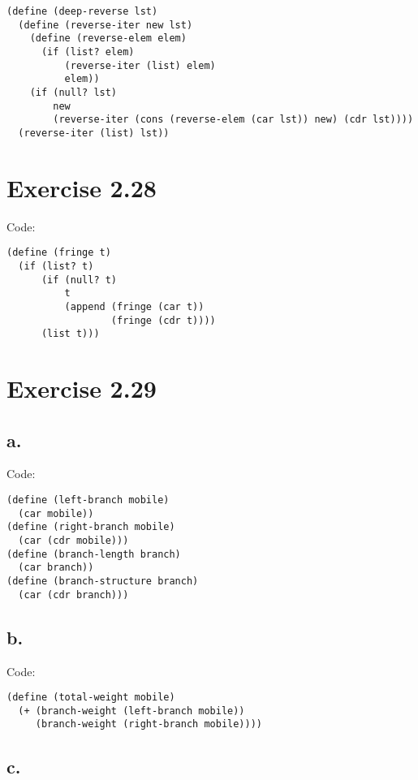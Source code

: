\documentclass[../main.tex]{subfiles}
\begin{document}
\begin{lstlisting}
(define (deep-reverse lst)
  (define (reverse-iter new lst)
    (define (reverse-elem elem)
      (if (list? elem)
          (reverse-iter (list) elem)
          elem))
    (if (null? lst)
        new
        (reverse-iter (cons (reverse-elem (car lst)) new) (cdr lst))))
  (reverse-iter (list) lst))
\end{lstlisting}

\section{Exercise 2.28}

Code:

\begin{lstlisting}
(define (fringe t)
  (if (list? t)
      (if (null? t)
          t
          (append (fringe (car t))
                  (fringe (cdr t))))
      (list t)))
\end{lstlisting}

\section{Exercise 2.29}

\subsection{a.}

Code:

\begin{lstlisting}
(define (left-branch mobile)
  (car mobile))
(define (right-branch mobile)
  (car (cdr mobile)))
(define (branch-length branch)
  (car branch))
(define (branch-structure branch)
  (car (cdr branch)))
\end{lstlisting}

\subsection{b.}

Code:

\begin{lstlisting}
(define (total-weight mobile)
  (+ (branch-weight (left-branch mobile))
     (branch-weight (right-branch mobile))))
\end{lstlisting}

\subsection{c.}
\end{document}
